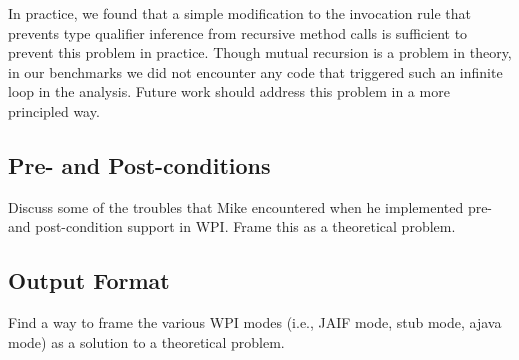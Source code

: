 In practice, we found that a simple modification to the invocation rule that
prevents type qualifier inference from recursive method calls is sufficient
to prevent this problem in practice. Though mutual recursion is a problem in
theory, in our benchmarks we did not encounter any code that triggered such
an infinite loop in the analysis. Future work should address this problem in
a more principled way.

\subsection{Pre- and Post-conditions}
\label{sec:pre-post-conditions}

Discuss some of the troubles that Mike encountered when
he implemented pre- and post-condition support in WPI. Frame
this as a theoretical problem. 

\subsection{Output Format}
\label{sec:output}

Find a way to frame the various WPI modes (i.e., JAIF mode,
stub mode, ajava mode) as a solution to a theoretical problem.

